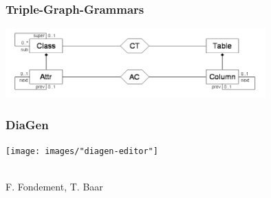 
\begin{frame}
  \frametitle{Triple-Graph-Grammars \footnotesize\cite{schurr_specification_1994,schurr_15_2008}}
  \centering
  \huge 
  \includegraphics[width=10cm]{images/tgg}
\end{frame}

\begin{frame}
  \frametitle{DiaGen \footnotesize\cite{minas_concepts_2002}}
  \centering
  \texttt{[image: images/"diagen-editor"]}
\end{frame}

\begin{frame}
  \hspace{-1cm}
  \large
   \\
  \hspace{-1cm}
  \small
  F. Fondement, T. Baar \cite{fondement_making_2005}
\end{frame}


%   




